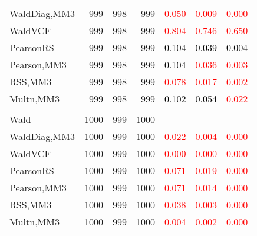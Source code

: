 \documentclass[
]{article}
\begin{document}
\begin{table}[H]
{\begin{tabular}[t]{lrrrrrr}
\hspace{1em}WaldDiag,MM3 & 999 & 998 & 999 & \textcolor{red}{0.050} & \textcolor{red}{0.009} & \textcolor{red}{0.000}\\
\hspace{1em}WaldVCF & 999 & 998 & 999 & \textcolor{red}{0.804} & \textcolor{red}{0.746} & \textcolor{red}{0.650}\\
\hspace{1em}PearsonRS & 999 & 998 & 999 & \textcolor{black}{0.104} & \textcolor{black}{0.039} & \textcolor{black}{0.004}\\
\hspace{1em}Pearson,MM3 & 999 & 998 & 999 & \textcolor{black}{0.104} & \textcolor{red}{0.036} & \textcolor{red}{0.003}\\
\hspace{1em}RSS,MM3 & 999 & 998 & 999 & \textcolor{red}{0.078} & \textcolor{red}{0.017} & \textcolor{red}{0.002}\\
\hspace{1em}Multn,MM3 & 999 & 998 & 999 & \textcolor{black}{0.102} & \textcolor{black}{0.054} & \textcolor{red}{0.022}\\
\addlinespace[0.3em]
\multicolumn{7}{l}{\textbf{3F 15V}}\\
\hspace{1em}Wald & 1000 & 999 & 1000 & \textcolor{black}{} & \textcolor{black}{} & \textcolor{black}{}\\
\hspace{1em}WaldDiag,MM3 & 1000 & 999 & 1000 & \textcolor{red}{0.022} & \textcolor{red}{0.004} & \textcolor{red}{0.000}\\
\hspace{1em}WaldVCF & 1000 & 999 & 1000 & \textcolor{red}{0.000} & \textcolor{red}{0.000} & \textcolor{red}{0.000}\\
\hspace{1em}PearsonRS & 1000 & 999 & 1000 & \textcolor{red}{0.071} & \textcolor{red}{0.019} & \textcolor{red}{0.000}\\
\hspace{1em}Pearson,MM3 & 1000 & 999 & 1000 & \textcolor{red}{0.071} & \textcolor{red}{0.014} & \textcolor{red}{0.000}\\
\hspace{1em}RSS,MM3 & 1000 & 999 & 1000 & \textcolor{red}{0.038} & \textcolor{red}{0.003} & \textcolor{red}{0.000}\\
\hspace{1em}Multn,MM3 & 1000 & 999 & 1000 & \textcolor{red}{0.004} & \textcolor{red}{0.002} & \textcolor{red}{0.000}\\
\bottomrule
\end{tabular}}
\endgroup{}
\end{table}
\end{document}

